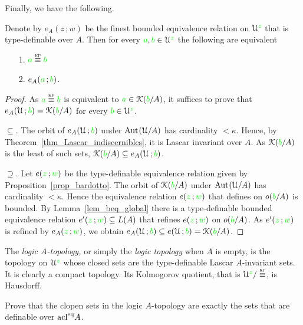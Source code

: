 Finally, we have the following.

\begin{theorem}\label{thm_Krupinski}
Denote by $e_A(z\,;w)$ be the finest bounded equivalence relation on $\EuScript U^{\color{green} z}$ that is type-definable over $A$.
Then for every ${\color{green} a}, {\color{green} b}\in\EuScript U^{\color{green} z}$ the following are equivalent
 \begin{itemize}
\item[1.] ${\gr a}\equivKP{\gr b}$
\item[2.] $e_A({\color{green} a}\,;{\color{green} b})$.
\end{itemize} 
\end{theorem}
\begin{proof} 
  As  ${\gr a}\equivKP{\gr b}$ is equivalent to ${\color{green} a}\in\EuScript K({\color{green} b}/A)$, it suffices to prove that $e_A(\EuScript U\,;{\color{green} b})=\EuScript K({\color{green} b}/A)$ for every ${\color{green} b}\in\EuScript U^{\color{green} z}$. 
 
  $\subseteq$. The orbit of $e_A(\EuScript U\,;{\color{green} b})$ under ${\rm Aut\kern.15ex}(\EuScript U/A)$ has cardinality $<\kappa$.
Hence, by Theorem~\ref{thm_Lascar_indiscernibles}, it is  Lascar invariant over $A$.
As $\EuScript K({\color{green} b}/A)$ is the least of such sets, $\EuScript K({\color{green} b}/A)\subseteq e_A(\EuScript U\,;{\color{green} b})$.
  
  $\supseteq$. Let $e({\color{green} z}\,;{\color{green} w})$ be the type-definable equivalence relation given by Proposition~\ref{prop_bardotto}. 
  The orbit of $\EuScript K({\color{green} b}/A)$ under ${\rm Aut\kern.15ex}(\EuScript U/A)$ has cardinality $<\kappa$. 
  Hence the equivalence relation $e({\color{green} z}\,;{\color{green} w})$ that defines on $o({\color{green} b}/A)$ is bounded. 
  By Lemma~\ref{lem_beq_global} there is a type-definable bounded equivalence relation $e'({\color{green} z}\,;{\color{green} w})\subseteq L(A)$ that refines $e({\color{green} z}\,;{\color{green} w})$ on $o({\color{green} b}/A)$. 
  As $e'({\color{green} z}\,;{\color{green} w})$ is refined by $e_A({\color{green} z}\,;{\color{green} w})$, we obtain $e_A(\EuScript U\,;{\color{green} b})\subseteq e(\EuScript U\,;{\color{green} b})=\EuScript K({\color{green} b}/A)$.
\end{proof}

The \emph{logic $A$-topology,} or simply the \emph{logic topology\/} when $A$ is empty, is the topology on $\EuScript U^{\color{green} z}$ whose closed sets are the type-definable Lascar $A$-invariant sets.
It is clearly a compact topology.
Its Kolmogorov quotient, that is $\U^{\gr z}/\equivKP$, is Hausdorff.

\begin{exercise}
Prove that the clopen sets in the logic $A$-topology are exactly the sets that are definable over ${\rm acl}^{{\rm eq}} A$.
\end{exercise}


